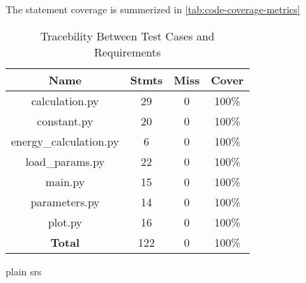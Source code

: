 \documentclass[12pt, titlepage]{article}
\begin{document}
The statement coverage is summerized in \autoref{tab:code-coverage-metrics}

\begin{table}[h!]
\begin{center}
\begin{tabular}{ c|c|c|c }
\hline
 \textbf{Name} &  \textbf{Stmts} &  \textbf{Miss} &  \textbf{Cover}\\ 
\hline

    calculation.py & 29 & 0 & 100\% \\ 
    \hline
    constant.py & 20 & 0 & 100\% \\ 
    \hline
    energy\_calculation.py & 6 & 0 & 100\% \\ 
    \hline
    load\_params.py  & 22 & 0 & 100\% \\ 
    \hline
    main.py  & 15 & 0 & 100\% \\ 
    \hline
    parameters.py & 14 & 0 & 100\% \\ 
    \hline
    plot.py & 16 & 0 & 100\% \\ 
    \hline
    \textbf{Total} & 122 & 0 & 100\% \\ 
 
\hline
\end{tabular}

\caption{Tracebility Between Test Cases and Requirements}
\label{tab:code-coverage-metrics}
\end{center}
\end{table}

\newpage
 {plain}
 {srs}
\end{document}

